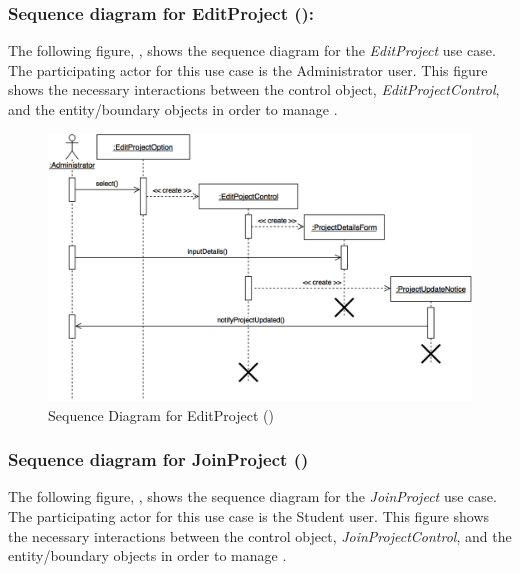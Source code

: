\documentclass[12pt,letterpaper]{article}
\begin{document}
\subsubsection*{Sequence diagram for EditProject ():}

The following figure, , shows the sequence diagram for the {\it EditProject} use case. The participating actor for this use case is
the Administrator user. This figure shows the necessary interactions between the control object, {\it EditProjectControl}, and the
entity/boundary objects in order to manage .

\begin{figure}[H]
	\centering{}
	\includegraphics[scale=0.25]{imgs/seq/edit-project.png}
	\caption[ - Sequence Diagram for EditProject]{Sequence Diagram for EditProject ()}
\end{figure}

\subsubsection*{Sequence diagram for JoinProject ()}

The following figure, , shows the sequence diagram for the {\it JoinProject} use case. The participating actor for this use case is
the Student user. This figure shows the necessary interactions between the control object, {\it JoinProjectControl}, and the
entity/boundary objects in order to manage .
\end{document}
